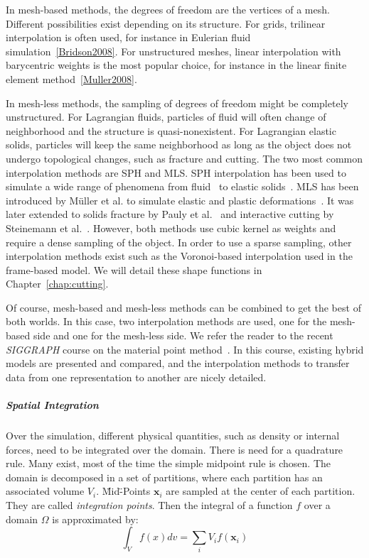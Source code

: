 In mesh-based methods, the degrees of freedom are the vertices of a mesh. 
Different possibilities exist depending on its structure. 
For grids, trilinear interpolation is often used, for instance in Eulerian fluid simulation~\ref{Bridson2008}.
For unstructured meshes, linear interpolation with barycentric weights is the most popular choice, for instance in the linear finite element method~\ref{Muller2008}.

In mesh-less methods, the sampling of degrees of freedom might be completely unstructured. 
For Lagrangian fluids, particles of fluid will often change of neighborhood and the structure is quasi-nonexistent.
For Lagrangian elastic solids, particles will keep the same neighborhood as long as the object does not undergo topological changes,
such as fracture and cutting.
The two most common interpolation methods are SPH and MLS.
SPH interpolation has been used to simulate a wide range of phenomena from fluid~\cite{Desbrun1999} to elastic solids~\cite{Becker2009}.
MLS has been introduced by M\"{u}ller et al. to simulate elastic and plastic deformations~\cite{Muller2004:melting}.
It was later extended to solids fracture by Pauly et al.~\cite{Pauly2005} and interactive cutting by Steinemann et al.~\cite{Steinemann2009}.
However, both methods use cubic kernel as weights and require a dense sampling of the object.
In order to use a sparse sampling, other interpolation methods exist such as the Voronoi-based interpolation used in the frame-based model.
We will detail these shape functions in Chapter~\ref{chap:cutting}.

Of course, mesh-based and mesh-less methods can be combined to get the best of both worlds.
In this case, two interpolation methods are used, one for the mesh-based side and one for the mesh-less side.
We refer the reader to the recent \emph{SIGGRAPH} course on the material point method~\cite{Jiang2016}.
In this course, existing hybrid models are presented and compared, and the interpolation methods to transfer data from one representation to another are nicely detailed.

\subparagraph{Spatial Integration}

Over the simulation, different physical quantities, such as density or internal forces, need to be integrated over the domain. 
There is need for a quadrature rule. 
Many exist, most of the time the simple midpoint rule is chosen. 
The domain is decomposed in a set of partitions, where each partition has an associated volume $V_{i}$. 
\"Mid\"-Points $\mathbf{x}_{i}$ are sampled at the center of each partition.
They are called \emph{integration points}. 
Then the integral of a function $f$ over a domain $\Omega$ is approximated by:
\begin{equation}
\label{eq:midpointRule}
\int_{V} f(x)dv = \sum_{i} V_{i}f(\mathbf{x}_{i})
\end{equation}

